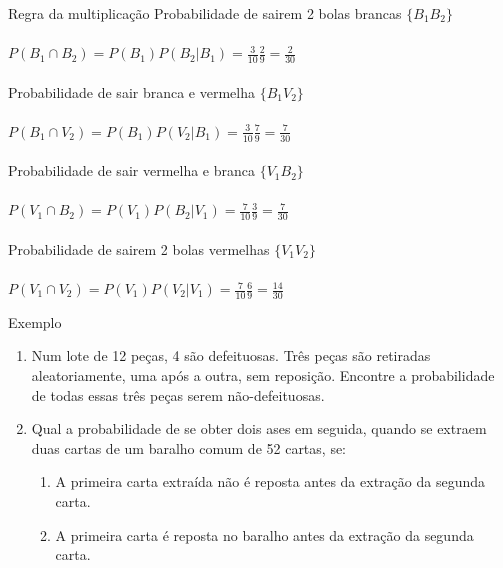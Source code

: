 \documentclass[10pt]{beamer}\usepackage[]{graphicx}\usepackage[]{color}
\theoremstyle{definition}
\begin{document}
\begin{frame}[fragile]{Regra da multiplicação} %
  Probabilidade de sairem 2 bolas brancas $\{B_1B_2\}$ \\~\\
  $P(B_1 \cap B_2) = P(B_1)P(B_2|B_1)  = \frac{3}{10} \frac{2}{9}
  = \frac{2}{30}$ \\~\\
  Probabilidade de sair branca e vermelha $\{B_1V_2\}$ \\~\\
  $P(B_1 \cap V_2) = P(B_1)P(V_2|B_1)  = \frac{3}{10} \frac{7}{9}
  = \frac{7}{30}$ \\~\\
  Probabilidade de sair vermelha e branca $\{V_1B_2\}$ \\~\\
  $P(V_1 \cap B_2) = P(V_1)P(B_2|V_1)  = \frac{7}{10} \frac{3}{9}
  = \frac{7}{30}$ \\~\\
    Probabilidade de sairem 2 bolas vermelhas $\{V_1V_2\}$ \\~\\
  $P(V_1 \cap V_2) = P(V_1)P(V_2|V_1)  = \frac{7}{10} \frac{6}{9}
  = \frac{14}{30}$
\end{frame}


\begin{frame}{Exemplo}
  \begin{enumerate}
  \item Num lote de 12 peças, 4 são defeituosas. Três peças são
    retiradas aleatoriamente, uma após a outra, sem reposição. Encontre
    a probabilidade de todas essas três peças serem não-defeituosas.
  \item Qual a probabilidade de se obter dois ases em seguida, quando se
    extraem duas cartas de um baralho comum de 52 cartas, se:
    \begin{enumerate}
    \item A primeira carta extraída não é reposta antes da extração da
      segunda carta.
    \item A primeira carta é reposta no baralho antes da extração da
      segunda carta.
    \end{enumerate}
  \end{enumerate}
\end{frame}
\end{document}
